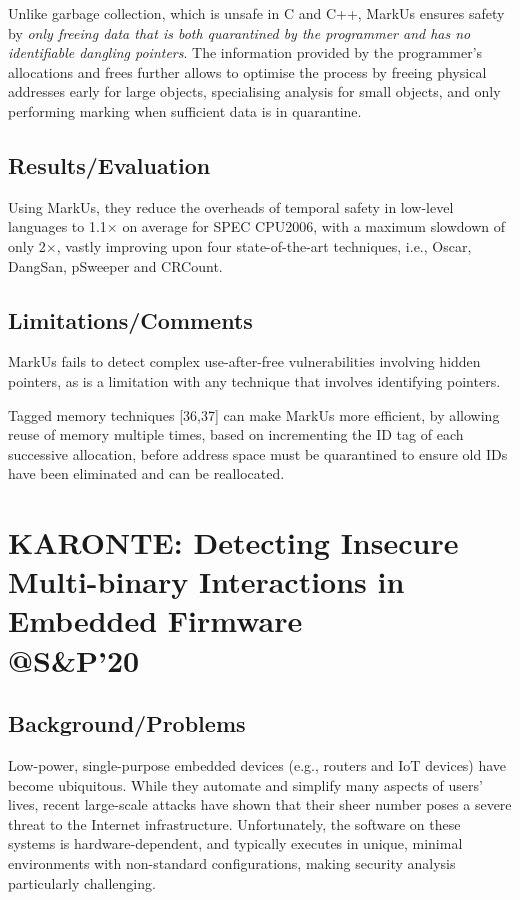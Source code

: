 Unlike garbage collection, which is unsafe in C and C++, MarkUs ensures safety by \emph{only freeing data that is both quarantined by the programmer and has no identifiable dangling pointers}. The information provided by the programmer’s allocations and frees further allows to optimise the process by freeing physical addresses early for large objects, specialising analysis for small objects, and only performing marking when sufficient data is in quarantine. 
\subsection{Results/Evaluation}
Using MarkUs, they reduce the overheads of temporal safety in low-level languages to 1.1$\times$ on average for SPEC CPU2006, with a maximum slowdown of only 2$\times$, vastly improving upon four state-of-the-art techniques, i.e., Oscar, DangSan, pSweeper and CRCount.
\subsection{Limitations/Comments}
MarkUs fails to detect complex use-after-free vulnerabilities involving hidden pointers, as is a limitation with any technique that involves identifying pointers.

Tagged memory techniques [36,37] can make MarkUs more efficient, by allowing reuse of memory multiple times, based on incrementing the ID tag of each successive allocation, before address space must be quarantined to ensure old IDs have been eliminated and can be reallocated.
\newpage
\section{KARONTE: Detecting Insecure Multi-binary Interactions in Embedded Firmware \\@S\&P'20}
\subsection{Background/Problems}
Low-power, single-purpose embedded devices (e.g., routers and IoT devices) have become ubiquitous. While they automate and simplify many aspects of users’ lives, recent large-scale attacks have shown that their sheer number poses a severe threat to the Internet infrastructure. Unfortunately, the software on these systems is hardware-dependent, and typically executes in unique, minimal environments with non-standard configurations, making security analysis particularly challenging.  

